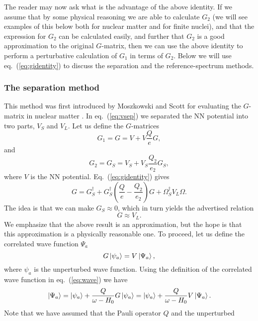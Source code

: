 The reader may now ask what is the advantage of the above identity. If
we assume that by some physical reasoning we are able to calculate
$G_2$ (we will see examples of this below both for nuclear matter and for
finite nuclei), and that the expression for $G_2$ can be calculated
easily, and further that $G_2$ is a good approximation
to the original $G$-matrix, then we can use the above identity to
perform a perturbative calculation of $G_1$ in terms of $G_2$.
Below we will use eq.\ (\ref{eq:gidentity}) to discuss
the separation and
the reference-spectrum methods.

\subsubsection{The separation method}

This method was first introduced by Moszkowski and Scott for
evaluating the $G$-matrix in nuclear matter \cite{ms61,ms62}.
In eq.\ (\ref{eq:vsep}) we separated the NN potential into two parts,
$V_S$ and $V_L$. Let us define the $G$-matrices
\begin{equation}
    G_1=G=V+V\frac{Q}{e}G,
\end{equation}
and
\begin{equation}
    G_2=G_S=V_S+V_S\frac{Q_2}{e_2}G_S,
    \label{eq:gs}
\end{equation}
where $V$ is the NN potential. Eq.\ (\ref{eq:gidentity}) gives
\begin{equation}
        G=G_S^{\dagger} +G_S^{\dagger}
        \left(\frac{Q}{e}-\frac{Q_2}{e_2}\right)G
        +\Omega_S^{\dagger}V_L\Omega.
        \label{eq:gidsep}
\end{equation}
The idea is that we can make $G_S\approx 0$, which in turn yields the
advertised relation
\[
   G\approx V_L.
\]
We emphasize that the above result is an approximation, but the hope
is that this approximation is a physically reasonable one.
To proceed, let us define the correlated wave function $\Psi_a$  
\begin{equation}
   G\left| \psi_a \right\rangle=V\left| \Psi_a \right\rangle,
\end{equation}
where $\psi_a$ is the 
unperturbed wave function. 
Using the definition of the correlated wave function in eq.\
(\ref{eq:wave}) we have
\begin{equation}
    \left| \Psi_a \right\rangle=\left| \psi_a \right\rangle+\frac{Q}{\omega - H_0}G\left| \psi_a \right\rangle=
    \left| \psi_a \right\rangle+\frac{Q}{\omega - H_0}V\left| \Psi_a \right\rangle.
    \label{eq:wavesep}
\end{equation}
Note that we have assumed that the Pauli operator $Q$ and the unperturbed
